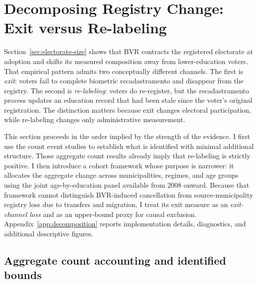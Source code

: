 
\section{Decomposing Registry Change: Exit versus Re-labeling}
\label{sec:decomposition}

Section~\ref{sec:electorate-size} shows that BVR contracts the registered electorate at adoption and shifts its measured composition away from lower-education voters. That empirical pattern admits two conceptually different channels. The first is \emph{exit}: voters fail to complete biometric recadastramento and disappear from the registry. The second is \emph{re-labeling}: voters do re-register, but the recadastramento process updates an education record that had been stale since the voter's original registration. The distinction matters because exit changes electoral participation, while re-labeling changes only administrative measurement.

This section proceeds in the order implied by the strength of the evidence. I first use the count event studies to establish what is identified with minimal additional structure. Those aggregate count results already imply that re-labeling is strictly positive. I then introduce a cohort framework whose purpose is narrower: it allocates the aggregate change across municipalities, regimes, and age groups using the joint age-by-education panel available from 2008 onward. Because that framework cannot distinguish BVR-induced cancellation from source-municipality registry loss due to transfers and migration, I treat its exit measure as an \emph{exit-channel loss} and as an upper-bound proxy for causal exclusion. Appendix~\ref{app:decomposition} reports implementation details, diagnostics, and additional descriptive figures.

\subsection{Aggregate count accounting and identified bounds}
\label{ssec:decomposition_crosscheck}

